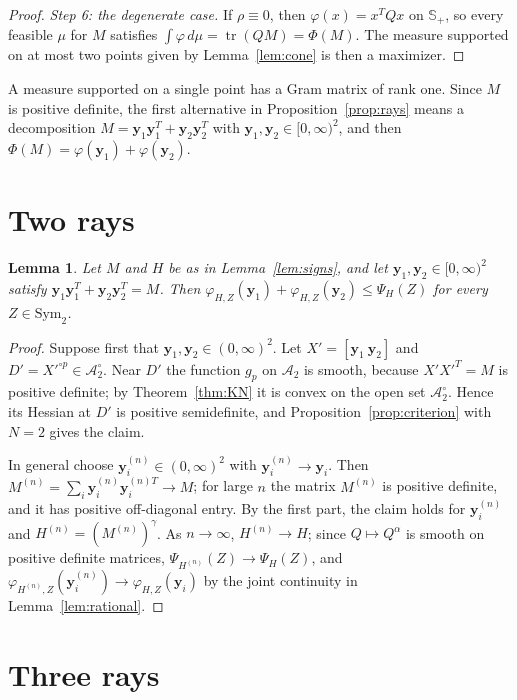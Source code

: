 \documentclass[11pt]{amsart}
\newtheorem{lemma}[theorem]{Lemma}
\theoremstyle{definition}
\theoremstyle{remark}
\numberwithin{equation}{section}
\newcommand{\tr}{\operatorname{tr}}
\newcommand{\Sym}{\mathrm{Sym}_2}
\newcommand{\cA}{\mathcal{A}}
\newcommand{\Sp}{\mathbb{S}_+}
\newcommand{\by}{\mathbf{y}}
\begin{document}
\begin{proof}
\emph{Step 6: the degenerate case.} If $\rho\equiv0$, then $\varphi(x)=x^TQx$ on $\Sp$, so every feasible $\mu$ for $M$ satisfies $\int\varphi\,d\mu=\tr(QM)=\Phi(M)$. The measure supported on at most two points given by Lemma~\ref{lem:cone} is then a maximizer.
\end{proof}

A measure supported on a single point has a Gram matrix of rank one. Since $M$ is positive definite, the first alternative in Proposition~\ref{prop:rays} means a decomposition $M=\by_1\by_1^T+\by_2\by_2^T$ with $\by_1,\by_2\in[0,\infty)^2$, and then $\Phi(M)=\varphi(\by_1)+\varphi(\by_2)$.

\section{Two rays}\label{sec:two}

\begin{lemma}\label{lem:two}
Let $M$ and $H$ be as in Lemma~\ref{lem:signs}, and let $\by_1,\by_2\in[0,\infty)^2$ satisfy $\by_1\by_1^T+\by_2\by_2^T=M$. Then $\varphi_{H,Z}(\by_1)+\varphi_{H,Z}(\by_2)\le\Psi_H(Z)$ for every $Z\in\Sym$.
\end{lemma}

\begin{proof}
Suppose first that $\by_1,\by_2\in(0,\infty)^2$. Let $X'=[\by_1\ \by_2]$ and $D'=X'^{\circ p}\in\cA_2^\circ$. Near $D'$ the function $g_p$ on $\cA_2$ is smooth, because $X'X'^T=M$ is positive definite; by Theorem~\ref{thm:KN} it is convex on the open set $\cA_2^\circ$. Hence its Hessian at $D'$ is positive semidefinite, and Proposition~\ref{prop:criterion} with $N=2$ gives the claim.

In general choose $\by_i^{(n)}\in(0,\infty)^2$ with $\by_i^{(n)}\to\by_i$. Then $M^{(n)}=\sum_i\by_i^{(n)}\by_i^{(n)T}\to M$; for large $n$ the matrix $M^{(n)}$ is positive definite, and it has positive off-diagonal entry. By the first part, the claim holds for $\by_i^{(n)}$ and $H^{(n)}=(M^{(n)})^\gamma$. As $n\to\infty$, $H^{(n)}\to H$; since $Q\mapsto Q^\alpha$ is smooth on positive definite matrices, $\Psi_{H^{(n)}}(Z)\to\Psi_H(Z)$, and $\varphi_{H^{(n)},Z}(\by_i^{(n)})\to\varphi_{H,Z}(\by_i)$ by the joint continuity in Lemma~\ref{lem:rational}.
\end{proof}

\section{Three rays}\label{sec:three}
\end{document}
